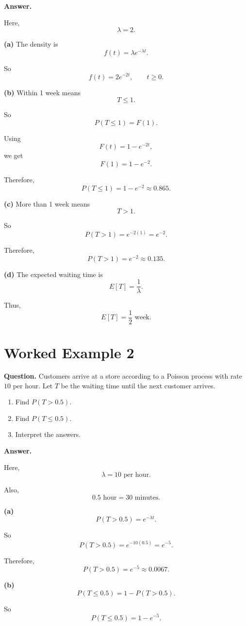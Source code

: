 \documentclass[12pt]{article}
\begin{document}
\textbf{Answer.}

Here,
\[
\lambda=2.
\]

\textbf{(a)}
The density is
\[
f(t)=\lambda e^{-\lambda t}.
\]

So
\[
\boxed{f(t)=2e^{-2t}, \qquad t\geq 0.}
\]

\textbf{(b)}
Within 1 week means
\[
T\leq 1.
\]

So
\[
P(T\leq 1)=F(1).
\]

Using
\[
F(t)=1-e^{-2t},
\]
we get
\[
F(1)=1-e^{-2}.
\]

Therefore,
\[
\boxed{P(T\leq 1)=1-e^{-2}\approx 0.865.}
\]

\textbf{(c)}
More than 1 week means
\[
T>1.
\]

So
\[
P(T>1)=e^{-2(1)}=e^{-2}.
\]

Therefore,
\[
\boxed{P(T>1)=e^{-2}\approx 0.135.}
\]

\textbf{(d)}
The expected waiting time is
\[
E[T]=\frac{1}{\lambda}.
\]

Thus,
\[
\boxed{E[T]=\frac{1}{2}\text{ week}.}
\]

\section{Worked Example 2}

\textbf{Question.}
Customers arrive at a store according to a Poisson process with rate \(10\) per hour. Let \(T\) be the waiting time until the next customer arrives.

\begin{enumerate}[label=(\alph*)]
    \item Find \(P(T>0.5)\).
    \item Find \(P(T\leq 0.5)\).
    \item Interpret the answers.
\end{enumerate}

\textbf{Answer.}

Here,
\[
\lambda=10 \text{ per hour}.
\]

Also,
\[
0.5 \text{ hour}=30 \text{ minutes}.
\]

\textbf{(a)}
\[
P(T>0.5)=e^{-\lambda t}.
\]

So
\[
P(T>0.5)=e^{-10(0.5)}=e^{-5}.
\]

Therefore,
\[
\boxed{P(T>0.5)=e^{-5}\approx 0.0067.}
\]

\textbf{(b)}
\[
P(T\leq 0.5)=1-P(T>0.5).
\]

So
\[
P(T\leq 0.5)=1-e^{-5}.
\]
\end{document}
